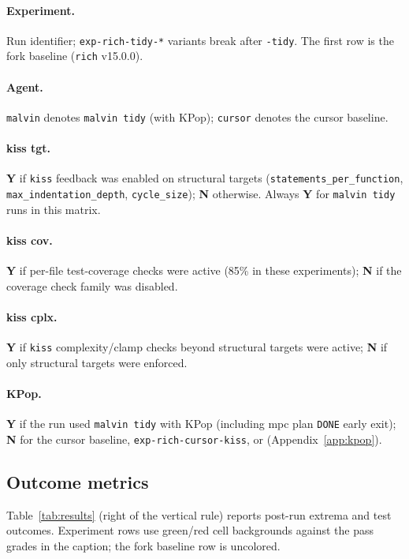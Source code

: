 \documentclass[11pt]{article}
\newcommand{\exptidy}[1]{\makecell[l]{\texttt{exp-rich-tidy}\\[1pt]\hspace{0.75em}\texttt{#1}}}
\begin{document}
\paragraph{Experiment.} Run identifier; \texttt{exp-rich-tidy-*} variants break after \texttt{-tidy}. 
The first row is the fork baseline (\texttt{rich} v15.0.0).

\paragraph{Agent.} \texttt{malvin} denotes \texttt{malvin tidy} (with KPop); \texttt{cursor} denotes the cursor baseline.

\paragraph{kiss tgt.} \textbf{Y} if \texttt{kiss} feedback was enabled on structural targets (\texttt{statements\_per\_function}, \texttt{max\_indentation\_depth}, \texttt{cycle\_size}); \textbf{N} otherwise. Always \textbf{Y} for \texttt{malvin tidy} runs in this matrix.

\paragraph{kiss cov.} \textbf{Y} if per-file test-coverage checks were active (85\% in these experiments); \textbf{N} if the coverage check family was disabled.

\paragraph{kiss cplx.} \textbf{Y} if \texttt{kiss} complexity/clamp checks beyond structural targets were active; \textbf{N} if only structural targets were enforced.

\paragraph{KPop.} \textbf{Y} if the run used \texttt{malvin tidy} with KPop (including mpc plan \texttt{DONE} early exit); \textbf{N} for the cursor baseline, \texttt{exp-rich-cursor-kiss}, or \exptidy{-no-kpop} (Appendix~\ref{app:kpop}).

\subsection{Outcome metrics}
\label{sec:outcome-metrics}

Table~\ref{tab:results} (right of the vertical rule) reports post-run extrema and test outcomes. Experiment rows use green/red cell backgrounds against the pass grades in the caption; the fork baseline row is uncolored.
\end{document}
